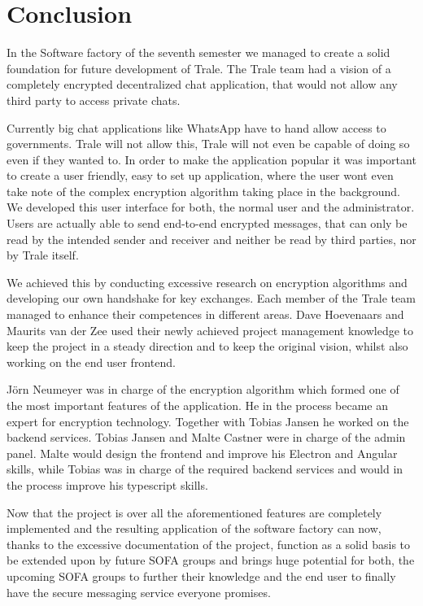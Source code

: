 \chapter{Conclusion}
In the Software factory of the seventh semester we managed to create a solid foundation for future development of Trale.
The Trale team had a vision of a completely encrypted decentralized chat application, that would not allow any third
party to access private chats.

Currently big chat applications like WhatsApp have to hand allow access to governments.
Trale will not allow this, Trale will not even be capable of doing so even if they wanted to.
In order to make the application popular it was important to create a user friendly, easy to set up application, where
the user wont even take note of the complex encryption algorithm taking place in the background.
We developed this user interface for both, the normal user and the administrator.
Users are actually able to send end-to-end encrypted messages, that can only be read by the intended sender and receiver
and neither be read by third parties, nor by Trale itself.

We achieved this by conducting excessive research on encryption algorithms and developing our own handshake for key
exchanges.
Each member of the Trale team managed to enhance their competences in different areas.
Dave Hoevenaars and Maurits van der Zee used their newly achieved project management knowledge to keep the project in
a steady direction and to keep the original vision, whilst also working on the end user frontend.

J\"orn Neumeyer was in charge of the encryption algorithm which formed one of the most important features of the
application.
He in the process became an expert for encryption technology.
Together with Tobias Jansen he worked on the backend services.
Tobias Jansen and Malte Castner were in charge of the admin panel.
Malte would design the frontend and improve his Electron and Angular skills, while Tobias was in charge of the required
backend services and would in the process improve his typescript skills.

Now that the project is over all the aforementioned features are completely implemented and the resulting application
of the software factory can now, thanks to the excessive documentation of the project, function as a solid basis to be
extended upon by future SOFA groups and brings huge potential for both, the upcoming SOFA groups to further their
knowledge and the end user to finally have the secure messaging service everyone promises.
